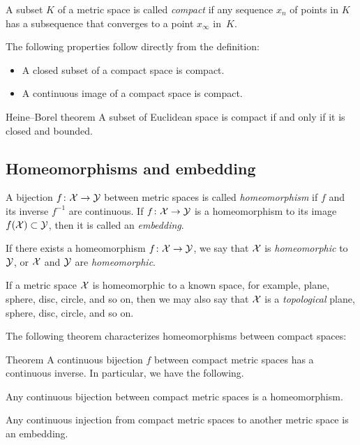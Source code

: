 A subset $K$ of a metric space is called \emph{compact} if any sequence $x_n$ of points in $K$ has a subsequence that converges to a point $x_\infty$ in~$K$.

The following properties follow directly from the definition:

\begin{itemize}
\item A closed subset of a compact space is compact.
\item A continuous image of a compact space is compact.
\end{itemize}

\begin{thm}{Heine--Borel theorem}\label{thm:Heine--Borel}
A subset of Euclidean space is compact if and only if it is closed and bounded.
\end{thm}


\subsection*{Homeomorphisms and embedding}

A bijection $f\colon\mathcal{X}\to\mathcal{Y}$ between metric spaces is called \emph{homeomorphism} if $f$ and its inverse $f^{-1}$ are continuous.
If $f\colon\mathcal{X}\to\mathcal{Y}$ is a homeomorphism to its image $f(\mathcal{X})\subset \mathcal{Y}$, then it is called an \emph{embedding}.

If there exists a homeomorphism $f\colon\mathcal{X}\to \mathcal{Y}$,
we say that ${\mathcal{X}}$ is {}\emph{homeomorphic} to $\mathcal{Y}$,
or $\mathcal{X}$ and $\mathcal{Y}$ are {}\emph{homeomorphic}.

If a metric space $\mathcal{X}$ is homeomorphic to a known space, for example, plane, sphere, disc, circle, and so on,
then we may also say that $\mathcal{X}$ is a \emph{topological} plane, sphere, disc, circle, and so on.

The following theorem characterizes homeomorphisms between compact spaces:

\begin{thm}{Theorem}\label{thm:Hausdorff-compact}
A continuous bijection $f$ between compact metric spaces has a continuous inverse.
In particular, we have the following.

\begin{subthm}{}
Any continuous bijection between compact metric spaces
is a homeomorphism.
\end{subthm}

\begin{subthm}{}
Any continuous injection from compact metric spaces to another metric space
is an embedding.
\end{subthm}


\end{thm}

